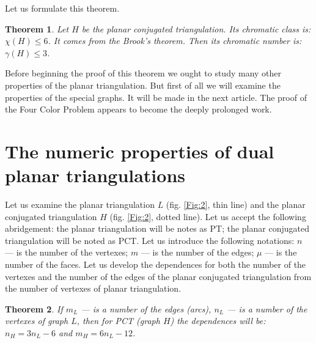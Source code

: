 \documentclass{amsart}
\newtheorem{theorem}{Theorem}
\theoremstyle{plain}
\numberwithin{equation}{section}
\begin{document}
Let us formulate this theorem.

\begin{theorem}
Let $H$ be the planar conjugated triangulation. Its chromatic class is: $\chi(H) \le 6$. It comes from the Brook's theorem. Then its chromatic number is: $\gamma(H) \le 3$.
\end {theorem}

Before beginning the proof of this theorem we ought to study many other properties of the planar triangulation. But first of all we will examine the properties of the special graphs. It will be made in the next article. The proof of the Four Color Problem appears to become the deeply prolonged work. 

\section{The numeric properties of dual planar triangulations} 

Let us examine the planar triangulation $L$ (fig. \ref{Fig:2}, thin line) and the planar conjugated triangulation $H$ (fig. \ref{Fig:2}, dotted line). Let us accept the following abridgement: the planar triangulation will be notes as PT; the planar conjugated triangulation will be noted as PCT. Let us introduce the following notations: $n$ --- is the number of the vertexes; $m$ --- is the number of the edges; $\mu$ --- is the number of the faces. Let us develop the dependences for both the number of the vertexes and the number of the edges of the planar conjugated triangulation from the number of vertexes of planar triangulation.

\begin{theorem}
If $m_L$ --- is a number of the edges (arcs), $n_L$ --- is a number of the vertexes of graph $L$, then for PCT (graph $H$) the dependences will be: $n_H=3n_L-6$ and $m_H=6n_L-12$.
\end{theorem}
\end{document}
